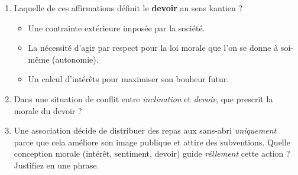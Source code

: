 \documentclass[11pt]{article}
\begin{document}
\begin{exercice}
\begin{enumerate}
    \item Laquelle de ces affirmations définit le \textbf{devoir} au sens kantien ?
    \begin{itemize}
        \item[A.] Une contrainte extérieure imposée par la société.
        \item[B.] La nécessité d'agir par respect pour la loi morale que l'on se donne à soi-même (autonomie).
        \item[C.] Un calcul d'intérêts pour maximiser son bonheur futur.
    \end{itemize}
    \item Dans une situation de conflit entre \textit{inclination} et \textit{devoir}, que prescrit la morale du devoir ?
    \item Une association décide de distribuer des repas aux sans-abri \textit{uniquement} parce que cela améliore son image publique et attire des subventions. Quelle conception morale (intérêt, sentiment, devoir) guide \textit{réllement} cette action ? Justifiez en une phrase.
\end{enumerate}
\end{exercice}
\end{document}
